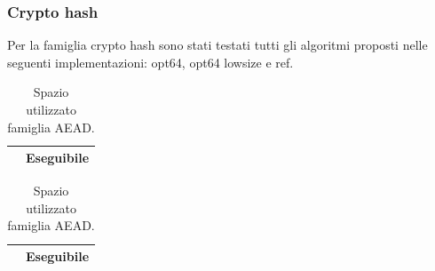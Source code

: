 \documentclass[12pt,a4paper,italian]{report}
\begin{document}
\subsubsection{Crypto hash}

Per la famiglia crypto hash sono stati testati tutti gli algoritmi proposti nelle seguenti implementazioni: opt64, opt64 lowsize e ref.

\begin{table}[h]
    \caption{Spazio utilizzato famiglia AEAD.}
    \begin{minipage}[t]{0.5\linewidth}
        \centering
        \begin{tabular}{|c|c|}
            \hline
             & Eseguibile \\
            \hline
            \hline
        \end{tabular}
    \end{minipage}
    \begin{minipage}[t]{0.5\linewidth}
        \centering
        \begin{tabular}{|c|c|}
            \hline
             & Eseguibile \\
            \hline
            \hline
        \end{tabular}
    \end{minipage}
\end{table}
\end{document}
